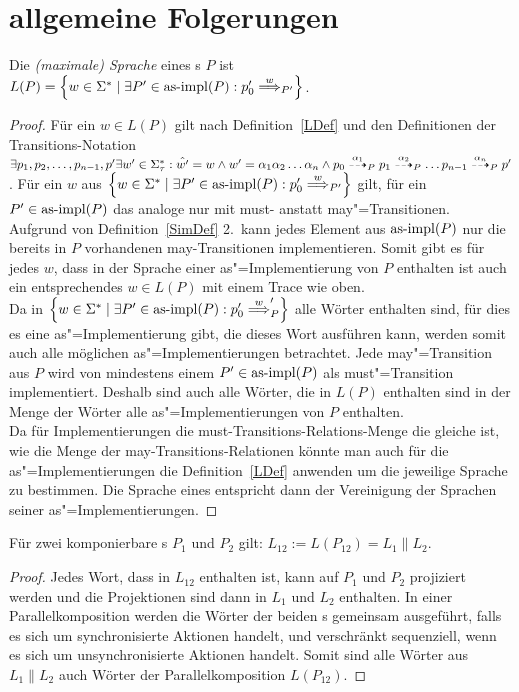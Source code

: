 \chapter{allgemeine Folgerungen}

\begin{Prop}
  \label{LImpProp}
  Die \emph{(maximale) Sprache} eines \MEIO{}s $P$ ist $L(P) = \left\{w\in
  \Sigma ^* \mid \exists P'\in\asimp (P) : p'_0\weakmust[w]_{P'} \right\}$.
\end{Prop}
\begin{proof}
  Für ein $w\in L(P)$ gilt nach Definition~\ref{LDef} und den Definitionen der
  Transitions-Notation $\exists p_1,p_2,\dots,p_{n-1},p' \exists w'\in\Sigma
  _{\tau} ^* : \hat{w'} = w \land w'=\alpha _1\alpha _2\dots\alpha _n \land
  p_0\may[\alpha _1]_P p_1\may[\alpha _2]_P \dots p_{n-1}\may[\alpha _n]_P
  p'$. Für ein $w$ aus $\left\{w\in \Sigma ^* \mid \exists P'\in\asimp (P) :
  p'_0\weakmust[w]_{P'} \right\}$ gilt, für ein $P'\in\mathrm{as}\text{-}\mathrm{impl} (P)$ das analoge
  nur mit must- anstatt may"=Transitionen.\\
  Aufgrund von Definition~\ref{SimDef} 2.\ kann jedes Element aus $\mathrm{as}\text{-}\mathrm{impl} (P)$
  nur die bereits in $P$ vorhandenen may-Transitionen implementieren. Somit
  gibt es für jedes $w$, dass in der Sprache einer as"=Implementierung von $P$
  enthalten ist auch ein entsprechendes $w\in L(P)$ mit einem Trace wie oben.\\
  Da in $\left\{w\in \Sigma ^* \mid \exists P'\in\asimp (P) :
  p'_0\weakmust[w]_P' \right\}$ alle Wörter enthalten sind, für dies es eine
  as"=Implementierung gibt, die dieses Wort ausführen kann, werden somit auch
  alle möglichen as"=Implementierungen betrachtet. Jede may"=Transition aus $P$
  wird von mindestens einem $P'\in\mathrm{as}\text{-}\mathrm{impl} (P)$ als must"=Transition
  implementiert. Deshalb sind auch alle Wörter, die in $L(P)$ enthalten sind in
  der Menge der Wörter alle as"=Implementierungen von $P$ enthalten.\\
  Da für Implementierungen die must-Transitions-Relations-Menge die gleiche ist,
  wie die Menge der may-Transitions-Relationen könnte man auch für die
  as"=Implementierungen die Definition~\ref{LDef} anwenden um die jeweilige
  Sprache zu bestimmen. Die Sprache eines \MEIO{} entspricht dann der
  Vereinigung der Sprachen seiner as"=Implementierungen.
\end{proof}

\begin{Prop}
  \label{LParallelProp}
  Für zwei komponierbare \MEIO{}s $P_1$ und $P_2$ gilt: $L_{12} := L(P_{12}) =
  L_1\|L_2$.
\end{Prop}
\begin{proof}
  Jedes Wort, dass in $L_{12}$ enthalten ist, kann auf $P_1$ und $P_2$
  projiziert werden und die Projektionen sind dann in $L_1$ und $L_2$
  enthalten. In einer Parallelkomposition werden die Wörter der beiden \MEIO{}s
  gemeinsam ausgeführt, falls es sich um synchronisierte Aktionen handelt, und
  verschränkt sequenziell, wenn es sich um unsynchronisierte Aktionen handelt.
  Somit sind alle Wörter aus $L_1\|L_2$ auch Wörter der Parallelkomposition
  $L(P_{12})$.
\end{proof}

